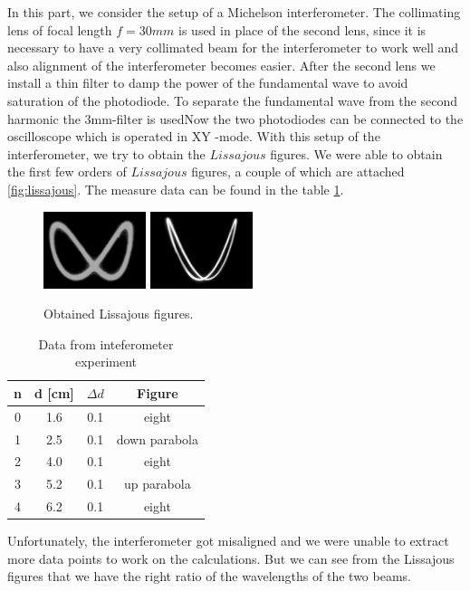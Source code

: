 In this part, we consider the setup of a Michelson interferometer. The collimating lens of focal length $f=30mm$ is used in place of the second lens, since it is necessary to have a very collimated beam for the interferometer to work well and also alignment of the interferometer becomes easier. After the second lens we install a thin filter to damp the power of the fundamental wave to avoid saturation of the photodiode. To separate the fundamental wave from the second harmonic the 3mm-filter is usedNow the two photodiodes can be connected to the oscilloscope which is operated in XY -mode. With this setup of the interferometer, we try to obtain the $Lissajous$ figures. We were able to obtain the first few orders of $Lissajous$ figures, a couple of which are attached \ref{fig:lissajous}. The measure data can be found in the table \ref{tab:lissajous}.\\

\begin{figure}[h!]
    \centering
    \includegraphics[width = 3cm]{./imagesandplots/lissjous1.jpg}
    \includegraphics[width = 3cm]{./imagesandplots/lissjous2.jpg}
    \caption{Obtained Lissajous figures.}
    \label{fig:lissjous}
\end{figure}

\begin{table}[]
    \centering
    \begin{tabular}{cccc}
        n & d [cm] & $\Delta d$ & Figure \\
        \hline
        0 & 1.6 & 0.1 & eight \\
        1 & 2.5 & 0.1 & down parabola \\
        2 & 4.0 & 0.1 & eight \\
        3 & 5.2 & 0.1 & up parabola \\
        4 & 6.2 & 0.1 & eight
    \end{tabular}
    \caption{Data from inteferometer experiment}
    \label{tab:lissajous}
\end{table}
Unfortunately, the interferometer got misaligned and we were unable to extract more data points to work on the calculations. But we can see from the Lissajous figures that we have the right ratio of the wavelengths of the two beams.